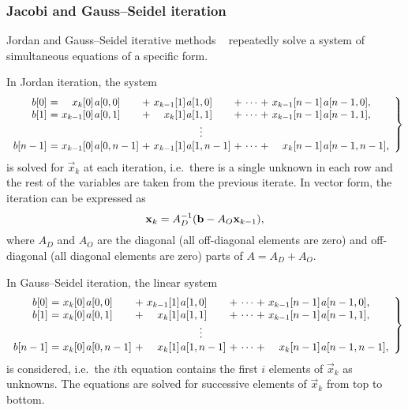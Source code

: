 \subsubsection{Jacobi and Gauss--Seidel iteration}

Jordan and Gauss--Seidel iterative methods%
~\citep[Section~10.3.2--3]{stewart2009probability} repeatedly solve a
system of simultaneous equations of a specific form.

In Jordan iteration, the system
{\small\begin{equation} \left.
      \begin{array}{r@{${} = {}$}*{2}{r@{\kern1pt}l@{${} + {}$}}c@{${} + {}$}r@{\kern1pt}l}
        b[0] & x_{k}[0] & a[0,0] & x_{k - 1}[1] & a[1,0] & \cdots & x_{k - 1}[n - 1] & a[n - 1,0] \text,\\
        b[1] & x_{k - 1}[0] & a[0,1] & x_{k}[1] & a[1,1] & \cdots & x_{k - 1}[n - 1] & a[n - 1,1] \text,\\
        \multicolumn{8}{c}{$\vdots$} \\
        b[n - 1] & x_{k - 1}[0] & a[0,n - 1] & x_{k - 1}[1] & a[1,n - 1] & \cdots & x_{k}[n - 1] & a[n - 1,n - 1] \text,\\
      \end{array}
    \right\}
  \end{equation}}%
is solved for $\vec{x}_{k}$ at each iteration, i.e.~there is a
single unknown in each row and the rest of the variables are taken
from the previous iterate. In vector form, the iteration can be
expressed as
\begin{equation}
  \vec{x}_{k} = A_D^{-1} (\vec{b} - A_O \vec{x}_{k - 1}) \text,
\end{equation}
where $A_D$ and $A_O$ are the diagonal (all off-diagonal elements are
zero) and off-diagonal (all diagonal elements are zero) parts of $A =
A_D + A_O$.

In Gauss--Seidel iteration, the linear system
{\small\begin{equation}
    \left.
      \begin{array}{r@{${} = {}$}*{2}{r@{\kern1pt}l@{${} + {}$}}c@{${} + {}$}r@{\kern1pt}l}
        b[0] & x_{k}[0] & a[0,0] & x_{k - 1}[1] & a[1,0] & \cdots & x_{k - 1}[n - 1] & a[n - 1,0] \text,\\
        b[1] & x_{k}[0] & a[0,1] & x_{k}[1] & a[1,1] & \cdots & x_{k - 1}[n - 1] & a[n - 1,1] \text,\\
        \multicolumn{8}{c}{$\vdots$} \\
        b[n - 1] & x_{k}[0] & a[0,n - 1] & x_{k}[1] & a[1,n - 1] & \cdots & x_{k}[n - 1] & a[n - 1,n - 1] \text,\\
      \end{array}
    \right\}
  \end{equation}}%
is considered, i.e.~the $i$th equation contains the first $i$ elements
of $\vec{x}_k$ as unknowns. The equations are solved for successive
elements of $\vec{x}_k$ from top to bottom.

